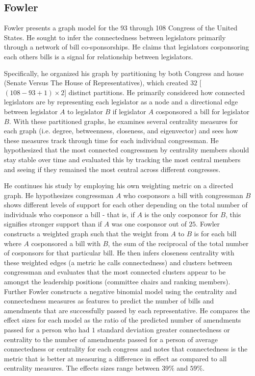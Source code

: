 \subsection{Fowler}

Fowler presents a graph model for the 93 through 108 Congress of the United 
States. He sought to infer the connectedness between legislators primarily 
through a network of bill co-sponsorships. He claims that legislators 
cosponsoring each others bills is a signal for relationship between legislators.

Specifically, he organized his graph by partitioning by both Congress and house 
(Senate Versus The House of Representatives), which created $32$ 
[$(108 - 93 + 1) \times 2$] distinct partitions. He primarily considered how 
connected legislators are by representing each legislator as a node and a 
directional edge between legislator $A$ to legislator $B$ if legislator $A$ 
cosponsored a bill for legislator $B$. With these partitioned graphs, he 
examines several centrality measures for each graph (i.e. degree, betweenness, 
closeness, and eigenvector) and sees how these measures track through time for 
each individual congressman. He hypothesized that the most connected 
congressmen by centrality members should stay stable over time and evaluated 
this by tracking the most central members and seeing if they remained the 
most central across different congresses.

He continues his study by employing his own weighting metric on a directed 
graph. He hypothesizes congressman $A$ who cosponsors a bill with congressman 
$B$ shows different levels of support for each other depending on the total 
number of individuals who cosponsor a bill - that is, if $A$ is the only 
cosponsor for $B$, this signifies stronger support than if $A$ was one 
cosponsor out of $25$. Fowler constructs a weighted graph such that the weight 
from $A$ to $B$ is for each bill where $A$ cosponsored a bill with $B$, the 
sum of the reciprocal of the total number of cosponsors for that particular 
bill. He then infers closeness centrality with these weighted edges (a metric 
he calls connectedness) and clusters between congressman and evaluates that the 
most connected clusters appear to be amongst the leadership positions 
(committee chairs and ranking members). Further Fowler constructs a negative 
binomial model using the centrality and connectedness measures as features to 
predict the number of bills and amendments that are successfully passed by each 
representative. He compares the effect sizes for each model as the ratio of the 
predicted number of amendments passed for a person who had $1$ standard 
deviation greater connectedness or centrality to the  number of amendments 
passed for a person of average connectedness or centrality for each congress 
and notes that connectedness is the metric that is better at measuring a 
difference in effect as compared to all centrality measures. The effects sizes 
range between $39\%$ and $59\%$.

